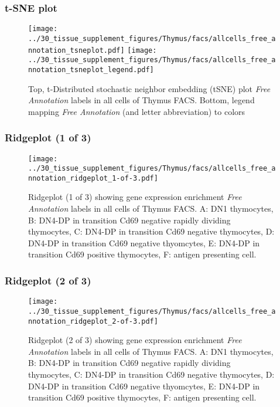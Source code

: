 \clearpage
\subsubsection{t-SNE plot}
\begin{figure}[h]
\centering
\texttt{[image: ../30\_tissue\_supplement\_figures/Thymus/facs/allcells\_free\_annotation\_tsneplot.pdf]}
\texttt{[image: ../30\_tissue\_supplement\_figures/Thymus/facs/allcells\_free\_annotation\_tsneplot\_legend.pdf]}
\caption{Top, t-Distributed stochastic neighbor embedding (tSNE) plot  \emph{Free Annotation} labels in all cells of Thymus FACS. Bottom, legend mapping \emph{Free Annotation} (and letter abbreviation) to colors}
\end{figure}


\clearpage

\subsubsection{Ridgeplot (1 of 3)}
\begin{figure}[h]
\centering
\texttt{[image: ../30\_tissue\_supplement\_figures/Thymus/facs/allcells\_free\_annotation\_ridgeplot\_1-of-3.pdf]}

\caption{ Ridgeplot (1 of 3)  showing gene expression enrichment \emph{Free Annotation} labels in all cells of Thymus FACS. A: DN1 thymocytes, B: DN4-DP in transition Cd69 negative rapidly dividing thymocytes, C: DN4-DP in transition Cd69 negative thymocytes, D: DN4-DP in transition Cd69 negative thyomcytes, E: DN4-DP in transition Cd69 positive thymocytes, F: antigen presenting cell.}
\end{figure}


\clearpage

\subsubsection{Ridgeplot (2 of 3)}
\begin{figure}[h]
\centering
\texttt{[image: ../30\_tissue\_supplement\_figures/Thymus/facs/allcells\_free\_annotation\_ridgeplot\_2-of-3.pdf]}

\caption{ Ridgeplot (2 of 3)  showing gene expression enrichment \emph{Free Annotation} labels in all cells of Thymus FACS. A: DN1 thymocytes, B: DN4-DP in transition Cd69 negative rapidly dividing thymocytes, C: DN4-DP in transition Cd69 negative thymocytes, D: DN4-DP in transition Cd69 negative thyomcytes, E: DN4-DP in transition Cd69 positive thymocytes, F: antigen presenting cell.}
\end{figure}


